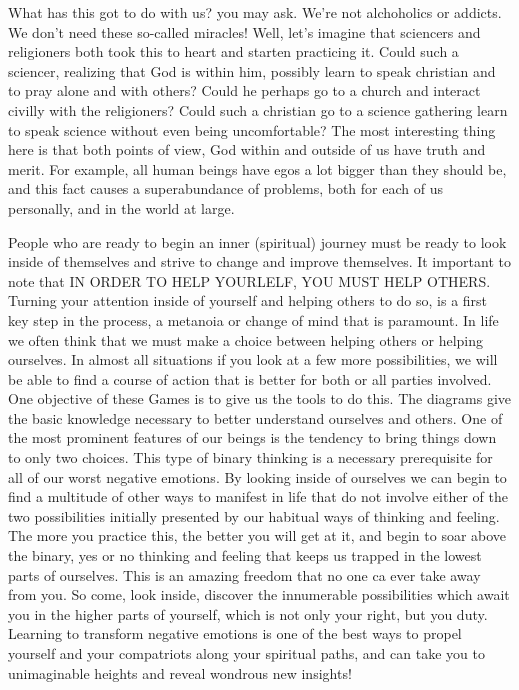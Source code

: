 \documentclass[12pt,letterpaper]{book}
\begin{document}
What has this got to do with us? you may ask. We're not alchoholics or addicts. We don't need these so-called miracles! Well, let's imagine that sciencers and religioners both took this to heart and starten practicing it. Could such a sciencer, realizing that God is within him, possibly learn to speak christian and to pray alone and with others? Could he perhaps go to a church and interact civilly with the religioners? Could such a christian go to a science gathering learn to speak science without even being uncomfortable? The most interesting thing here is that both points of view, God within and outside of us have truth and merit. For example, all human beings have egos a lot bigger than they should be, and this fact causes a superabundance of problems, both for each of us personally, and in the world at large.

People who are  ready to begin an inner (spiritual) journey must be ready to look inside of themselves and strive to change and improve themselves. It important to note that IN ORDER TO HELP YOURLELF, YOU MUST HELP OTHERS. Turning your attention inside of yourself and helping others to do so, is a first key step in the process, a metanoia or change of mind that is paramount. In life we often think that we must make a choice between helping others or helping ourselves. In almost all situations if you look at a few more possibilities, we will be able to find a course of action that is better for both or all parties involved. One objective of these Games is to give us the tools to do this. The diagrams give the basic knowledge necessary to better understand ourselves and others. One of the most prominent features of our beings is the tendency to bring things down to only two choices. This type of binary thinking is a necessary prerequisite for all of our worst negative emotions. By looking inside of ourselves we can begin to find a multitude of other ways to manifest in life that do not involve either of the two possibilities initially presented by our habitual ways of thinking and feeling. The more you practice this, the better you will get at it, and begin to soar above the binary, yes or no thinking and feeling that keeps us trapped in the lowest parts of ourselves. This is an amazing freedom that no one ca ever take away from you. So come, look inside, discover the innumerable possibilities which await you in the higher parts of yourself, which is not only your right, but you duty. Learning to transform negative emotions is one of the best ways to propel yourself and your compatriots along your spiritual paths, and can take you to unimaginable heights and reveal wondrous new insights!
\end{document}
